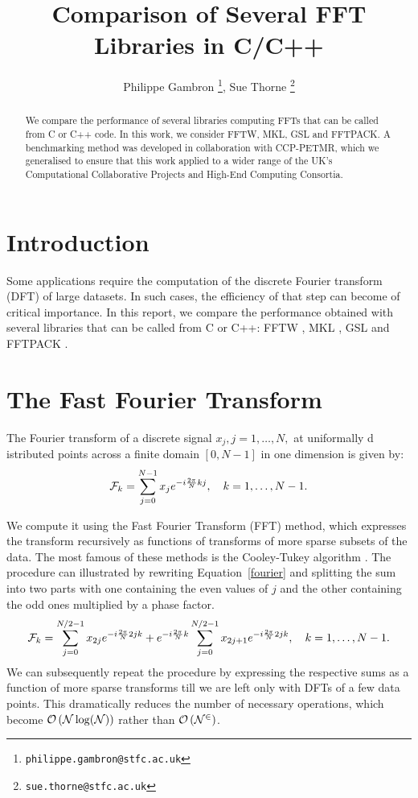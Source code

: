 \documentclass[12pt, a4paper]{article} \setlength{\textheight}{24cm}
\begin{document}
\title{Comparison of Several FFT Libraries in C/C++} \author{Philippe
  Gambron \thanks{\texttt{philippe.gambron{@}stfc.ac.uk}}, Sue Thorne
  \thanks{\texttt{sue.thorne{@}stfc.ac.uk}}} 
\maketitle
\begin{abstract}
  We compare the performance of several libraries computing FFTs that
  can be called from C or C++ code. In this work, we consider FFTW,
  MKL, GSL and FFTPACK. A benchmarking method was developed in
  collaboration with CCP-PETMR, which we generalised to ensure that
  this work applied to a wider range of the UK's Computational
  Collaborative Projects and High-End Computing Consortia.
\end{abstract}
\section{Introduction}
Some applications require the computation of the discrete Fourier
transform (DFT) of large datasets. In such cases, the efficiency of
that step can become of critical importance. In this report, we
compare the performance obtained with several libraries that can be
called from C or C++: FFTW \cite{fftw}, MKL \cite{mkl}, GSL \cite{gsl}
and FFTPACK \cite{fftpack}.

\section{The Fast Fourier Transform}

The Fourier transform of a discrete signal $x_j, j=1,\ldots,N,$ at
uniformally d istributed points across a finite domain $[0,N-1]$ in
one dimension is given by:
\begin{equation}\label{fourier} {\cal F}_k=\sum_{j=0}^{N-1} x_j
  e^{-i\frac{2\pi}{N}kj}, \quad k=1,\ldots,N-1.
\end{equation}

We compute it using the Fast Fourier Transform (FFT) method, which
expresses the transform recursively as functions of transforms of more
sparse subsets of the data. The most famous of these methods is the
Cooley-Tukey algorithm \cite{CT}. The procedure can illustrated by
rewriting Equation~\ref{fourier} and splitting the sum into two parts
with one containing the even values of $j$ and the other containing
the odd ones multiplied by a phase factor.
\begin{equation}\label{ct} {\cal
    F}_k=\sum_{j=0}^{N/2-1}x_{2j}e^{-i\frac{2\pi}{N}2jk}+e^{-i\frac{2\pi}{N}k}\sum_{j=0}^{N/2-1}x_{2j+1}e^{-i\frac{2\pi}{N}2jk},
  \quad k=1,\ldots, N-1.
\end{equation}
We can subsequently repeat the procedure by expressing the respective
sums as a function of more sparse transforms till we are left only
with DFTs of a few data points. This dramatically reduces the number
of necessary operations, which become $\cal{O}\left(N\log(N)\right)$
rather than $\cal{O}\left(N^2\right)$.
\end{document}
